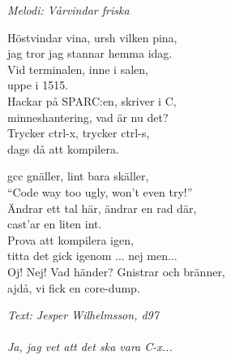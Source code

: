 {\footnotesize\textit{Melodi: Vårvindar friska}}\par
\vspace{10pt}
Höstvindar vina, ursh vilken pina,\\
jag tror jag stannar hemma idag.\\
Vid terminalen, inne i salen,\\
uppe i 1515.\\
Hackar på SPARC:en, skriver i C,\\
minneshantering, vad är nu det?\\
Trycker ctrl-x, trycker ctrl-s,\\
dags då att kompilera.\par
\vspace{10pt}
gcc gnäller, lint bara skäller,\\
``Code way too ugly, won't even try!''\\
Ändrar ett tal här, ändrar en rad där,\\
cast'ar en liten int.\\
Prova att kompilera igen,\\
titta det gick igenom ... nej men...\\
Oj! Nej! Vad händer? Gnistrar och bränner,\\
ajdå, vi fick en core-dump.\par
\vspace{10pt}
{\footnotesize\textit{Text: Jesper Wilhelmsson, d97\\ \\ Ja, jag vet
    att det ska vara C-x...}}
